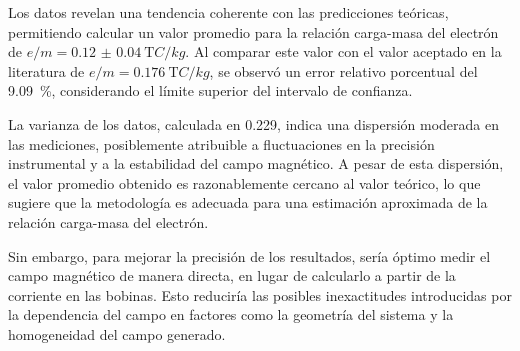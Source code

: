 Los datos revelan una tendencia coherente con las predicciones teóricas,
permitiendo calcular un valor promedio para la relación carga-masa del electrón
de \(e/m =\qty{0.12(4)}{\tera C \per kg}\).
Al comparar este valor con el valor aceptado en la literatura de
\(e/m =\qty{0.176}{\tera C \per kg}\), se observó un error relativo porcentual
del \qty{9.09}{\percent}, considerando el límite superior del intervalo de
confianza.

La varianza de los datos, calculada en \num{0.229}, indica una dispersión
moderada en las mediciones, posiblemente atribuible a fluctuaciones en la
precisión instrumental y a la estabilidad del campo magnético.
A pesar de esta dispersión, el valor promedio obtenido es razonablemente cercano
al valor teórico, lo que sugiere que la metodología es adecuada para una
estimación aproximada de la relación carga-masa del electrón.

Sin embargo, para mejorar la precisión de los resultados, sería óptimo medir el
campo magnético de manera directa, en lugar de calcularlo a partir de la
corriente en las bobinas. Esto reduciría las posibles inexactitudes introducidas
por la dependencia del campo en factores como la geometría del sistema y la
homogeneidad del campo generado.
